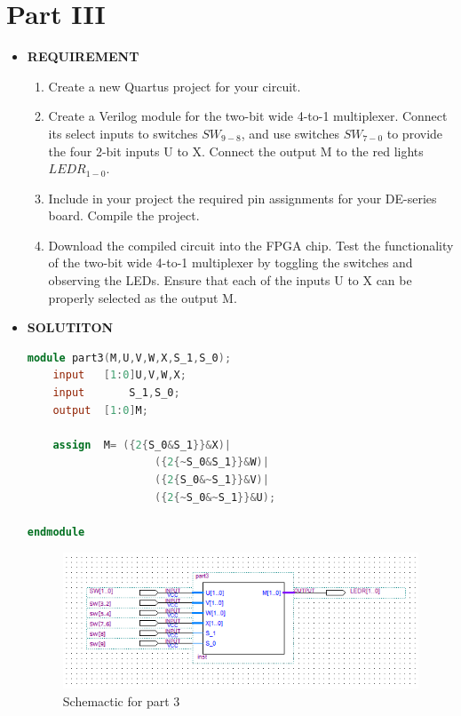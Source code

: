 \section{Part III }
\begin{itemize}
    \item [] \textbf{REQUIREMENT}
        \begin{enumerate}
            \item Create a new Quartus project for your circuit.
            \item Create a Verilog module for the two-bit wide 4-to-1 multiplexer. Connect its select inputs to switches $SW_{9-8}$, and use switches $SW_{7-0}$ to provide the four 2-bit inputs U to X. Connect the output M to the red lights $LEDR_{1-0}$.
            \item Include in your project the required pin assignments for your DE-series board. Compile the project.
            \item Download the compiled circuit into the FPGA chip. Test the functionality of the two-bit wide 4-to-1 multiplexer by toggling the switches and observing the LEDs. Ensure that each of the inputs U to X can be properly selected as the output M.
        \end{enumerate}
    \item [] \textbf{SOLUTITON}
        \begin{lstlisting}[language = verilog]
module part3(M,U,V,W,X,S_1,S_0);
    input 	[1:0]U,V,W,X;
    input		S_1,S_0;
    output	[1:0]M;
    
    assign 	M= ({2{S_0&S_1}}&X)|
                    ({2{~S_0&S_1}}&W)|
                    ({2{S_0&~S_1}}&V)|
                    ({2{~S_0&~S_1}}&U);
	
endmodule
        \end{lstlisting}
        \begin{figure}[h]
            \centering
            \includegraphics[width = \textwidth]{source/picture/Lab1/Lab1_3.png}
            \caption{Schemactic for part 3}
        \end{figure}
    
\end{itemize}
\clearpage
